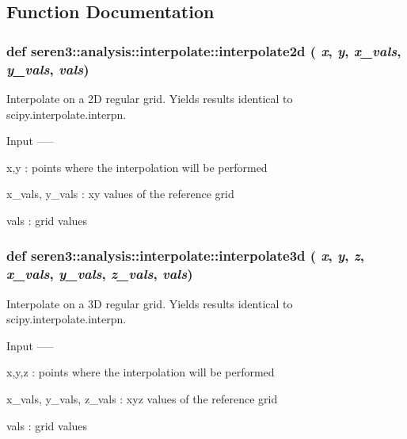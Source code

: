\subsection{Function Documentation}
\hypertarget{namespaceseren3_1_1analysis_1_1interpolate_a9da1592e0f683e03b44709c0f5cec544}{
\subsubsection[{interpolate2d}]{\setlength{\rightskip}{0pt plus 5cm}def seren3::analysis::interpolate::interpolate2d ( {\em x}, \/   {\em y}, \/   {\em x\_\-vals}, \/   {\em y\_\-vals}, \/   {\em vals})}}
\label{namespaceseren3_1_1analysis_1_1interpolate_a9da1592e0f683e03b44709c0f5cec544}
\begin{DoxyVerb}
Interpolate on a 2D regular grid. 
Yields results identical to scipy.interpolate.interpn. 

Input
-----

x,y : points where the interpolation will be performed

x_vals, y_vals : xy values of the reference grid

vals : grid values
\end{DoxyVerb}
 \hypertarget{namespaceseren3_1_1analysis_1_1interpolate_a6fd7ed3d3bb23ed9a25dd2bfa655ae66}{
\subsubsection[{interpolate3d}]{\setlength{\rightskip}{0pt plus 5cm}def seren3::analysis::interpolate::interpolate3d ( {\em x}, \/   {\em y}, \/   {\em z}, \/   {\em x\_\-vals}, \/   {\em y\_\-vals}, \/   {\em z\_\-vals}, \/   {\em vals})}}
\label{namespaceseren3_1_1analysis_1_1interpolate_a6fd7ed3d3bb23ed9a25dd2bfa655ae66}
\begin{DoxyVerb}
Interpolate on a 3D regular grid. 
Yields results identical to scipy.interpolate.interpn. 

Input
-----

x,y,z : points where the interpolation will be performed

x_vals, y_vals, z_vals : xyz values of the reference grid

vals : grid values
\end{DoxyVerb}
 
